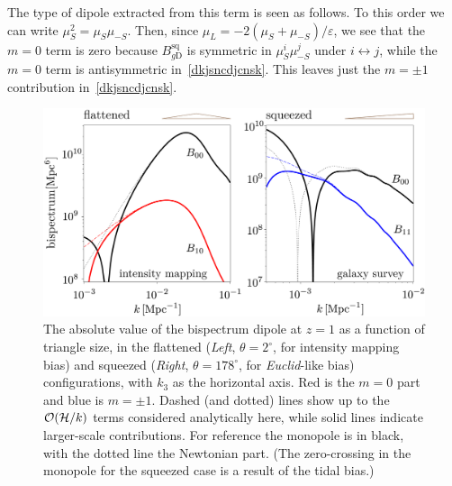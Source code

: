 The type of dipole extracted from this term is seen as follows. To this order we can write $\mu_{S}^2=\mu_{S}\mu_{-S}$. Then,  since $\mu_L=-2(\mu_S+\mu_{-S})/
\varepsilon$, we see that the $m=0$ term is zero because $B_{g {\mathrm{D}}}^{\mathrm{sq}}$ is symmetric in $\mu_{S}^i\mu_{-S}^j$ under $i\leftrightarrow j$, while the $m=0$ term is antisymmetric in~\eqref{dkjsncdjcnsk}. This leaves just the $m=\pm1$ contribution in~\eqref{dkjsncdjcnsk}.

\begin{figure}[!ht]
\begin{center}
\includegraphics[width=\columnwidth]{fig/figuresv2-02}
\caption{ The absolute value of the bispectrum dipole at $z=1$  as a function of triangle size, in the flattened (\emph{Left}, $\theta=2^\circ$, for intensity mapping bias) and squeezed (\emph{Right}, $\theta=178^\circ$, for \emph{Euclid}-like bias) configurations, with $k_3$ as the horizontal axis. Red is the $m=0$ part and blue is $m=\pm1$. Dashed (and dotted) lines show up to the $\mathcal{O}(\mathcal{H}/k)$ terms considered analytically here, while solid lines indicate larger-scale contributions. For reference the monopole is in black, with the dotted line the Newtonian part.  (The zero-crossing in the monopole for the squeezed case is a result of the tidal bias.)}
\label{snakcjnsdlkcans}
\end{center}
\end{figure}
